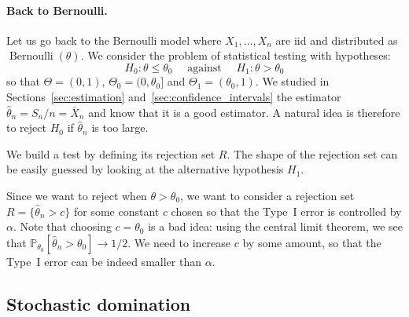 \documentclass[
	fontsize=11pt, %
	twoside=false, %
	numbers=noenddot, %
]{kaobook}
\DeclareMathOperator{\ber}{Bernoulli}
\renewcommand{\P}{\mathbb P}
\newcommand{\wh}{\widehat}
\newcommand{\goes}{\rightarrow}
\begin{document}
\paragraph{Back to Bernoulli.} %

Let us go back to the Bernoulli model where $X_1, \ldots, X_n$ are iid and distributed as $\ber(\theta)$.
We consider the problem of statistical testing with hypotheses:
\begin{equation}
	\label{eq:chap03-tests-hypothesis}
	H_0 : \theta \leq \theta_0 \quad \text{ against } \quad H_1 : \theta > \theta_0
\end{equation}
so that $\Theta = (0, 1)$, $\Theta_0 = (0, \theta_0]$ and $\Theta_1 = (\theta_0, 1)$.
We studied in Sections~\ref{sec:estimation} and~\ref{sec:confidence_intervals} the estimator $\wh \theta_n = S_n / n = \bar X_n$ and know that it is a good estimator.
A natural idea is therefore to reject $H_0$ if $\wh \theta_n$ is too large.
\begin{recipe}
	We build a test by defining its rejection set $R$. The shape of the rejection set can be easily guessed by looking at the alternative hypothesis $H_1$.
\end{recipe}
Since we want to reject when $\theta > \theta_0$, we want to consider a rejection set $R = \{ \wh \theta_n > c \}$ for some constant $c$ chosen so that the Type~I error is controlled by $\alpha$.
Note that choosing $c = \theta_0$ is a bad idea: using the central limit theorem, we see that $\P_{\theta_0}[\wh \theta_n > \theta_0] \goes 1/2$.
We need to increase $c$ by some amount, so that the Type~I error can be indeed smaller than $\alpha$.%

\subsection{Stochastic domination} %

\end{document}
